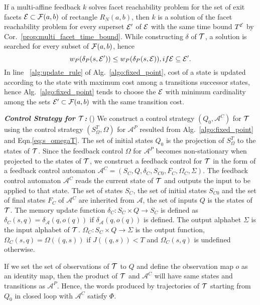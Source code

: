 \documentclass{ifacconf}
\newcommand{\FNab}{{\cal F}(a,b)}
\newcommand{\RNab}{R_N(a,b)}
\newcommand{\TS}{{\cal T}}
\newcommand{\AUTOMATON}{\ensuremath{\mathcal{A}}}
\newcommand{\Fset}{{\cal E}}
\newcommand{\TIMEBOUND}{\ensuremath{T}}
\begin{document}
If a multi-affine feedback $k$ solves facet reachability problem for the set of exit facets $\Fset \subset \FNab$ of rectangle $\RNab$, then $k$ is a solution of the facet reachability problem for every superset $\Fset'$ of $\Fset$ with the same time bound $T^\Fset$ by Cor.~\ref{prop:multi_facet_time_bound}. While constructing $\delta$ of $\TS$, a solution is searched for every subset of $\FNab$, hence
\begin{equation}
	w_P(\delta_P(s, \Fset')) \leq w_P(\delta_P(s,\Fset)), if \Fset \subseteq \Fset'.
\end{equation} 
In line~ \ref{alg:update_rule} of Alg.~\ref{algo:fixed_point}, cost of a state is updated according to the state with maximum cost among a transitions successor states, hence Alg.~\ref{algo:fixed_point} tends to choose the $\Fset$ with minimum cardinality among the sets $\Fset' \subset \FNab$ with the same transition cost.


\textbf{\emph{Control Strategy for $\TS$: }} (\cite{Kloetzer:2008NonDet})
We construct a control strategy $(Q_0,\AUTOMATON^C)$ for $\TS$ using the control strategy $(S^\TIMEBOUND_\Omega, \Omega)$ for $\AUTOMATON^P$ resulted from Alg.~\ref{algo:fixed_point} and Eqn.\eqref{eq:s_omegaT}.
The set of initial states $Q_0$ is the projection of $S^\TIMEBOUND_\Omega$ to the states of $\TS$.
Since the feedback control $\Omega$ for $\AUTOMATON^P$ becomes non-stationary when projected to the states of $\TS$, we construct a feedback control for $\TS$ in the form of a feedback control automaton $\AUTOMATON^C = (S_C, Q, \delta_C, S_{C0}, F_C, \Omega_C, \Sigma)$. 
The feedback control automaton $\AUTOMATON^C$ reads the current state of $\TS$ and outputs the input to be applied to that state. 
The set of states $S_C$, the set of initial states $S_{C0}$ and the set of final states $F_C$ of $\AUTOMATON^C$ are inherited from $\AUTOMATON$, the set of inputs $Q$ is the states of $\TS$. 
The memory update function $\delta_C : S_C \times Q \longrightarrow S_C$ is defined as  $\delta_C(s,q) = \delta_\AUTOMATON(q,o(q))$ if $\delta_\AUTOMATON(q,o(q))$ is defined. The output alphabet $\Sigma$ is the input alphabet of $\TS$. $\Omega_C : S_C \times Q \longrightarrow \Sigma$ is the output function, $\Omega_C(s,q) = \Omega((q,s))$ if $J((q,s)) < T$ and $\Omega_C(s,q)$ is undefined otherwise. 



If we set the set of observations of $\TS$ to $Q$ and define the observation map $o$ as an identity map, then the product of $\TS$ and $\AUTOMATON^C$ will have same states and transitions as $\AUTOMATON^P$. 
Hence, the words produced by trajectories of $\TS$ starting from $Q_0$ in closed loop with $\AUTOMATON^C$ satisfy $\Phi$.
\end{document}
